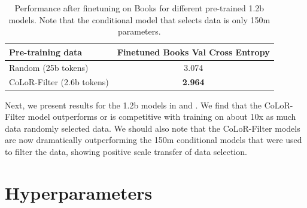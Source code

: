 \documentclass{article}
\begin{document}
\begin{table}[h]
    \caption{Performance after finetuning on Books for different pre-trained 1.2b models. Note that the conditional model that selects data is only 150m parameters.}
    \label{tab:1.2b-books-fine}
    \centering
    \begin{tabular}{l|c}
    \toprule
Pre-training data & Finetuned Books Val Cross Entropy \\ \midrule
Random (25b tokens) & 3.074\\
CoLoR-Filter (2.6b tokens) & \textbf{2.964}\\
\bottomrule
    \end{tabular}
\end{table}

\begin{table}[h]
    \caption{Held out performance after finetuning on downstream data for different pre-trained 1.2b models.}
    \label{tab:1.2b-down-fine}
    \centering
\end{table}

Next, we present results for the 1.2b models in  and . We find that the CoLoR-Filter model outperforms or is competitive with training on about 10x as much data randomly selected data. We should also note that the CoLoR-Filter models are now dramatically outperforming the 150m conditional models that were used to filter the data, showing positive scale transfer of data selection.





\section{Hyperparameters}\label{sec:hyperparams}
\end{document}
